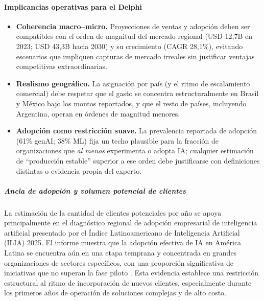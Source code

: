 \paragraph{Implicancias operativas para el Delphi}

\begin{itemize}
  \item \textbf{Coherencia macro--micro.} Proyecciones de ventas y adopción deben ser compatibles con el orden de magnitud del mercado regional (USD 12{,}7B en 2023; USD 43{,}3B hacia 2030) y su crecimiento (CAGR 28{,}1\%), evitando escenarios que impliquen capturas de mercado irreales sin justificar ventajas competitivas extraordinarias. \parencite{GerosaHermansen2025EconomicWorkforceAI}

  \item \textbf{Realismo geográfico.} La asignación por país (y el ritmo de escalamiento comercial) debe respetar que el gasto se concentra estructuralmente en Brasil y México bajo los montos reportados, y que el resto de países, incluyendo Argentina, operan en órdenes de magnitud menores. \parencite{JungKatz2025ImpactoEconomicoIAALC}

  \item \textbf{Adopción como restricción suave.} La prevalencia reportada de adopción (61\% genAI; 38\% ML) fija un techo plausible para la fracción de organizaciones que \emph{al menos} experimenta o adopta IA; cualquier estimación de “producción estable” superior a ese orden debe justificarse con definiciones distintas o evidencia propia del experto. \parencite{GerosaHermansen2025EconomicWorkforceAI}
\end{itemize}




\subparagraph{Ancla de adopción y volumen potencial de clientes}
La estimación de la cantidad de clientes potenciales por año se apoya principalmente en el diagnóstico regional de adopción empresarial de inteligencia artificial presentado por el Índice Latinoamericano de Inteligencia Artificial (ILIA) 2025. El informe muestra que la adopción efectiva de IA en América Latina se encuentra aún en una etapa temprana y concentrada en grandes organizaciones de sectores específicos, con una proporción significativa de iniciativas que no superan la fase piloto \cite{ILIA2025}. Esta evidencia establece una restricción estructural al ritmo de incorporación de nuevos clientes, especialmente durante los primeros años de operación de soluciones complejas y de alto costo.

